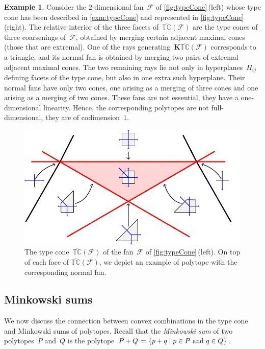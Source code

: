 \documentclass{amsart}
\theoremstyle{definition}
\newtheorem{example}[theorem]{Example}
\renewcommand{\b}[1]{{\boldsymbol{#1}}} %
\newcommand{\set}[2]{\left\{ #1 \;\middle|\; #2 \right\}} %
\newcommand{\eqdef}{\mbox{\,\raisebox{0.2ex}{\scriptsize\ensuremath{\mathrm:}}\ensuremath{=}\,}} %
\newcommand{\darkblue}{\color{darkblue}} %
\newcommand{\defn}[1]{\textsl{\darkblue #1}} %
\newcommand{\Fan}{\mathcal{F}} %
\newcommand{\ctypeCone}{\overline{\mathbb{TC}}} %
\begin{document}
\begin{example}
\label{exm:typeConeCoarsenings}
Consider the $2$-dimensional fan~$\Fan$ of \cref{fig:typeCone}\,(left) whose type cone has been described in \cref{exm:typeCone} and represented in \cref{fig:typeCone}\,(right).
The relative interior of the three facets of~$\ctypeCone(\Fan)$ are the type cones of three coarsenings of~$\Fan$, obtained by merging certain adjacent maximal cones (those that are extremal). One of the rays generating~$\b{K}\ctypeCone(\Fan)$ corresponds to a triangle, and its normal fan is obtained by merging two pairs of extremal adjacent maximal cones. The two remaining rays lie not only in hyperplanes~$H_{ij}$ defining facets of the type cone, but also in one extra such hyperplane. Their normal fans have only two cones, one arising as a merging of three cones and one arising as a merging of two cones. These fans are not essential, they have a one-dimensional linearity. Hence, the corresponding polytopes are not full-dimensional, they are of codimension~$1$.

\begin{figure}[htpb]
	\capstart
	\centerline{\includegraphics[scale=.8]{typeConeCoarsenings}}
	\caption{The type cone~$\ctypeCone(\Fan)$ of the fan~$\Fan$ of \cref{fig:typeCone}\,(left). On top of each face of $\ctypeCone(\Fan)$, we depict an example of polytope with the corresponding normal fan.}
	\label{fig:typeConeCoarsenings}
\end{figure}
\end{example}


\subsection{Minkowski sums}
\label{subsec:MinkowskiSums}

We now discuss the connection between convex combinations in the type cone and Minkowski sums of polytopes.
Recall that the \defn{Minkowski sum} of two polytopes~$P$ and~$Q$ is the polytope $P + Q \eqdef \set{p + q}{p \in P\text{ and } q \in Q}$. 
\end{document}
